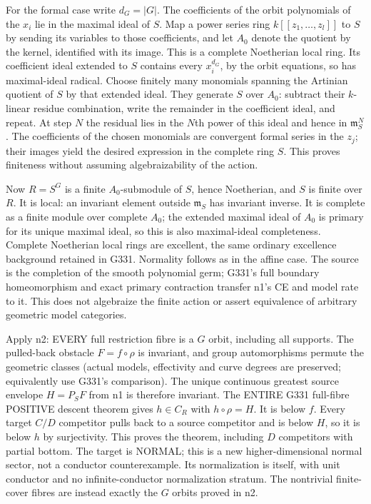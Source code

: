 \documentclass[11pt]{article}
\begin{document}
For the formal case write $d_G=|G|$. The coefficients of the orbit
polynomials of the $x_i$ lie in the maximal ideal of $S$. Map a power
series ring $k[[z_1,\ldots,z_l]]$ to $S$ by sending its variables to those
coefficients, and let $A_0$ denote the quotient by the kernel, identified
with its image. This is a complete Noetherian local ring. Its coefficient
ideal extended to $S$ contains every $x_i^{d_G}$, by the orbit equations,
so has maximal-ideal radical. Choose finitely many monomials spanning
the Artinian quotient of $S$ by that extended ideal. They generate $S$
over $A_0$: subtract their $k$-linear residue combination, write the
remainder in the coefficient ideal, and repeat. At step $N$ the residual
lies in the $N$th power of this ideal and hence in $\mathfrak m_S^N$.
The coefficients of the chosen monomials are convergent formal series in
the $z_j$; their images yield the desired expression in the complete ring
$S$. This proves finiteness without assuming algebraizability of the action.

Now $R=S^G$ is a finite $A_0$-submodule of $S$, hence Noetherian, and $S$
is finite over $R$. It is local: an invariant element outside
$\mathfrak m_S$ has invariant inverse. It is complete as a finite module
over complete $A_0$; the extended maximal ideal of $A_0$ is primary for
its unique maximal ideal, so this is also maximal-ideal completeness.
Complete Noetherian local rings are excellent, the same ordinary
excellence background retained in G331. Normality follows as in the
affine case. The source is the completion of the smooth polynomial germ;
G331's full boundary homeomorphism and exact primary contraction transfer
n1's CE and model rate to it. This does not algebraize the finite action
or assert equivalence of arbitrary geometric model categories.

Apply n2: EVERY full restriction fibre is a $G$ orbit, including all
supports. The pulled-back obstacle $F=f\circ\rho$ is invariant, and group
automorphisms permute the geometric classes (actual models, effectivity
and curve degrees are preserved; equivalently use G331's comparison).
The unique continuous greatest source envelope $H=P_S F$ from n1 is
therefore invariant. The ENTIRE G331 full-fibre POSITIVE descent theorem
gives $h\in C_R$ with $h\circ\rho=H$. It is below $f$. Every target
$C/D$ competitor pulls back to a source competitor and is below $H$,
so it is below $h$ by surjectivity. This proves the theorem, including
$D$ competitors with partial bottom. The target is NORMAL; this is a
new higher-dimensional normal sector, not a conductor counterexample.
Its normalization is itself, with unit conductor and no infinite-conductor
normalization stratum. The nontrivial finite-cover fibres are instead
exactly the $G$ orbits proved in n2.
\end{document}
